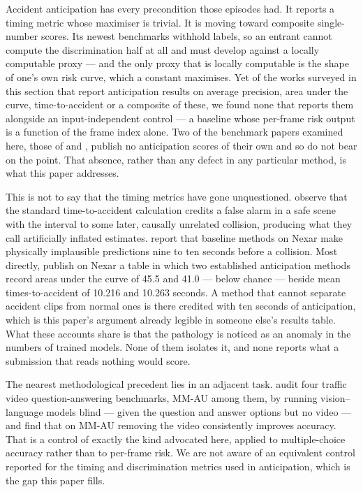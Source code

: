 Accident anticipation has every precondition those episodes had. It reports a timing metric whose maximiser is trivial. It is moving toward composite single-number scores. Its newest benchmarks withhold labels, so an entrant cannot compute the discrimination half at all and must develop against a locally computable proxy --- and the only proxy that is locally computable is the shape of one's own risk curve, which a constant maximises. Yet of the works surveyed in this section that report anticipation results on average precision, area under the curve, time-to-accident or a composite of these, we found none that reports them alongside an input-independent control --- a baseline whose per-frame risk output is a function of the frame index alone. Two of the benchmark papers examined here, those of \citet{moura2025nexar} and \citet{fang2024mmau}, publish no anticipation scores of their own and so do not bear on the point. That absence, rather than any defect in any particular method, is what this paper addresses.

This is not to say that the timing metrics have gone unquestioned. \citet{zhao2025top} observe that the standard time-to-accident calculation credits a false alarm in a safe scene with the interval to some later, causally unrelated collision, producing what they call artificially inflated estimates. \citet{goldshmidt2025badas} report that baseline methods on Nexar make physically implausible predictions nine to ten seconds before a collision. Most directly, \citet{caselli2026flara} publish on Nexar a table in which two established anticipation methods record areas under the curve of 45.5 and 41.0 --- below chance --- beside mean times-to-accident of 10.216 and 10.263 seconds. A method that cannot separate accident clips from normal ones is there credited with ten seconds of anticipation, which is this paper's argument already legible in someone else's results table. What these accounts share is that the pathology is noticed as an anomaly in the numbers of trained models. None of them isolates it, and none reports what a submission that reads nothing would score.

The nearest methodological precedent lies in an adjacent task. \citet{korkut2026blind} audit four traffic video question-answering benchmarks, MM-AU among them, by running vision--language models blind --- given the question and answer options but no video --- and find that on MM-AU removing the video consistently improves accuracy. That is a control of exactly the kind advocated here, applied to multiple-choice accuracy rather than to per-frame risk. We are not aware of an equivalent control reported for the timing and discrimination metrics used in anticipation, which is the gap this paper fills.

